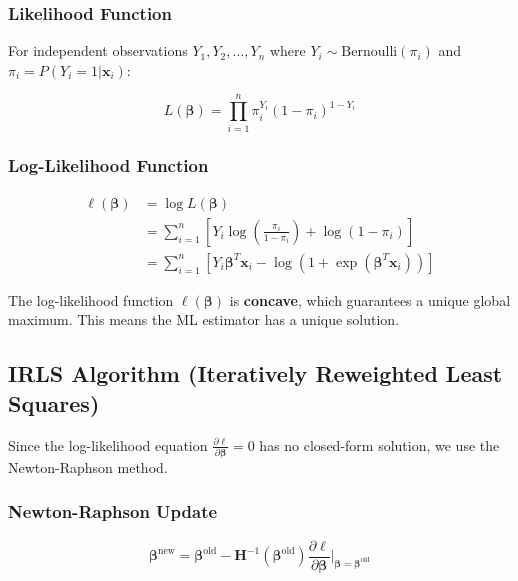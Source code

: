 \documentclass[12pt,a4paper]{article}
\begin{document}
\subsubsection{Likelihood Function}

For independent observations $Y_1, Y_2, \ldots, Y_n$ where $Y_i \sim \text{Bernoulli}(\pi_i)$ and $\pi_i = P(Y_i = 1|\mathbf{x}_i)$:

\begin{equation}
L(\boldsymbol{\beta}) = \prod_{i=1}^n \pi_i^{Y_i}(1-\pi_i)^{1-Y_i}
\end{equation}

\subsubsection{Log-Likelihood Function}

\begin{align}
\ell(\boldsymbol{\beta}) &= \log L(\boldsymbol{\beta}) \\
&= \sum_{i=1}^n \left[ Y_i \log\left(\frac{\pi_i}{1-\pi_i}\right) + \log(1-\pi_i) \right] \\
&= \sum_{i=1}^n \left[ Y_i \boldsymbol{\beta}^T\mathbf{x}_i - \log(1 + \exp(\boldsymbol{\beta}^T\mathbf{x}_i)) \right]
\end{align}

\begin{tcolorbox}[colback=red!5!white,colframe=red!75!black,title=Important Property]
The log-likelihood function $\ell(\boldsymbol{\beta})$ is \textbf{concave}, which guarantees a unique global maximum. This means the ML estimator has a unique solution.
\end{tcolorbox}

\subsection{IRLS Algorithm (Iteratively Reweighted Least Squares)}

Since the log-likelihood equation $\frac{\partial \ell}{\partial \boldsymbol{\beta}} = 0$ has no closed-form solution, we use the Newton-Raphson method.

\subsubsection{Newton-Raphson Update}

\begin{equation}
\boldsymbol{\beta}^{\text{new}} = \boldsymbol{\beta}^{\text{old}} - \mathbf{H}^{-1}(\boldsymbol{\beta}^{\text{old}}) \frac{\partial \ell}{\partial \boldsymbol{\beta}}\bigg|_{\boldsymbol{\beta}=\boldsymbol{\beta}^{\text{old}}}
\end{equation}
\end{document}

